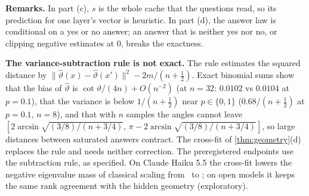 \textbf{Remarks.} In part (c), $s$ is the whole cache that the questions read, so its prediction for one layer's vector is heuristic. In part (d), the answer law is conditional on a yes or no answer; an answer that is neither yes nor no, or clipping negative estimates at $0$, breaks the exactness.

\textbf{The variance-subtraction rule is not exact.} The rule estimates the squared distance by $\|\hat\vartheta(x)-\hat\vartheta(x')\|^2-2m/(n+\frac12)$. Exact binomial sums show that the bias of $\hat\vartheta$ is $\cot\vartheta/(4n)+O(n^{-2})$ (at $n=32$: $0.0102$ vs $0.0104$ at $p=0.1$), that the variance is below $1/(n+\frac12)$ near $p\in\{0,1\}$ ($0.68/(n+\frac12)$ at $p=0.1$, $n=8$), and that with $n$ samples the angles cannot leave $[2\arcsin\sqrt{(3/8)/(n+3/4)},\,\pi-2\arcsin\sqrt{(3/8)/(n+3/4)}]$, so large distances between saturated answers contract. The cross-fit of \cref{thm:geometry}(d) replaces the rule and needs neither correction. The preregistered endpoints use the subtraction rule, as specified. On Claude Haiku 5.5 the cross-fit lowers the negative eigenvalue mass of classical scaling from \CFClosedANeg\ to \CFClosedANegCF; on open models it keeps the same rank agreement with the hidden geometry (exploratory).

